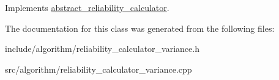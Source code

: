 Implements \hyperlink{classabstract__reliability__calculator_a4457d3eece3c873e2cc2455a6dfdbb88}{abstract\-\_\-reliability\-\_\-calculator}.



The documentation for this class was generated from the following files\-:\begin{DoxyCompactItemize}
\item 
include/algorithm/reliability\-\_\-calculator\-\_\-variance.\-h\item 
src/algorithm/reliability\-\_\-calculator\-\_\-variance.\-cpp\end{DoxyCompactItemize}
